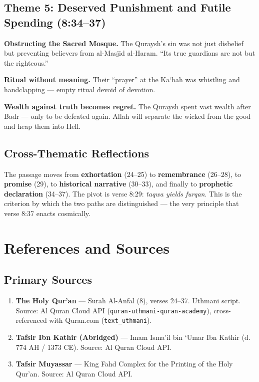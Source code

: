 \documentclass[11pt,a4paper,openany]{book}
\begin{document}
\section{Theme 5: Deserved Punishment and Futile Spending (8:34--37)}
\begin{themebox}
\textbf{Obstructing the Sacred Mosque.} The Quraysh's sin was not just disbelief but preventing believers from al-Masjid al-Haram. ``Its true guardians are not but the righteous.''

\textbf{Ritual without meaning.} Their ``prayer'' at the Ka`bah was whistling and handclapping --- empty ritual devoid of devotion.

\textbf{Wealth against truth becomes regret.} The Quraysh spent vast wealth after Badr --- only to be defeated again. Allah will separate the wicked from the good and heap them into Hell.
\end{themebox}

\section{Cross-Thematic Reflections}
\begin{themebox}[Connections]
The passage moves from \textbf{exhortation} (24--25) to \textbf{remembrance} (26--28), to \textbf{promise} (29), to \textbf{historical narrative} (30--33), and finally to \textbf{prophetic declaration} (34--37). The pivot is verse 8:29: \textit{taqwa yields furqan}. This is the criterion by which the two paths are distinguished --- the very principle that verse 8:37 enacts cosmically.
\end{themebox}

\chapter{References and Sources}

\section{Primary Sources}
\begin{enumerate}
\item \textbf{The Holy Qur'an} --- Surah Al-Anfal (8), verses 24--37. Uthmani script.
Source: Al Quran Cloud API (\texttt{quran-uthmani-quran-academy}), cross-referenced with Quran.com (\texttt{text\_uthmani}).

\item \textbf{Tafsir Ibn Kathir (Abridged)} --- Imam Isma'il bin `Umar Ibn Kathir (d. 774 AH / 1373 CE). Source: Al Quran Cloud API.

\item \textbf{Tafsir Muyassar} --- King Fahd Complex for the Printing of the Holy Qur'an. Source: Al Quran Cloud API.
\end{enumerate}
\end{document}
